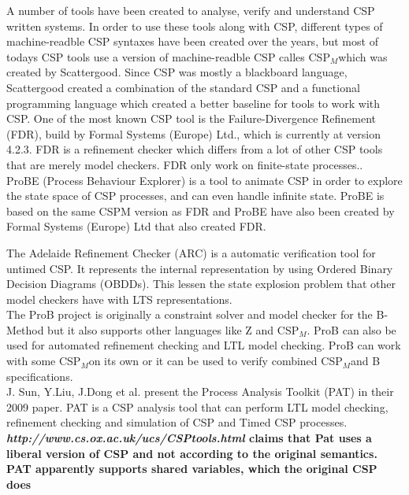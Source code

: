 \documentclass[a4paper]{report}
\newcommand{\cspm}{CSP$_M$}
\begin{document}
A number of tools have been created to analyse, verify and understand CSP written systems. In order to use these tools along with CSP, different types of machine-readble CSP syntaxes have been created over the years, but most of todays CSP tools use a version of machine-readble CSP calles \cspm which was created by Scattergood\cite{Scattergood1998}. Since CSP was mostly a blackboard language, Scattergood created a combination of the standard CSP and a functional programming language which created a better baseline for tools to work with CSP. One of the most known CSP tool is the Failure-Divergence Refinement (FDR), build by Formal Systems (Europe) Ltd., which is currently at version 4.2.3\cite{fdr}. FDR is a refinement checker which differs from a lot of other CSP tools that are merely model checkers. FDR only work on finite-state processes..\\ 

ProBE (Process Behaviour Explorer)\cite{probe}  is a tool to animate CSP in order to explore the state space of CSP processes, and can even handle infinite state. ProBE is based on the same CSPM version as FDR and ProBE have also been created by Formal Systems (Europe) Ltd that also created FDR. 

The Adelaide Refinement Checker (ARC)\cite{Parashkevov1996} is a automatic verification tool for untimed CSP. It represents the internal representation by using Ordered Binary Decision Diagrams (OBDDs). This lessen the state explosion problem that other model checkers have with LTS representations.   \\ 

The ProB project\cite{ProB} is originally a constraint solver and model checker for the B-Method but it also supports other languages like Z and \cspm. ProB can also be used for automated refinement checking and LTL model checking. ProB can work with some \cspm on its own or it can be used to verify combined \cspm and B specifications. \\

J. Sun, Y.Liu, J.Dong et al. present the Process Analysis Toolkit (PAT) in their 2009 paper\cite{Sun2009}. PAT is a CSP analysis tool that can perform LTL model checking, refinement checking and simulation of CSP and Timed CSP processes. \textbf{\textit{http://www.cs.ox.ac.uk/ucs/CSPtools.html} claims that Pat uses a liberal version of CSP and not according to the original semantics. PAT apparently supports shared variables, which the original CSP does }\\
\end{document}
